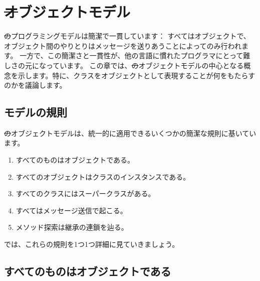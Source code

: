 \documentclass[a4paper,10pt,twoside]{book}
\begin{document}
	\renewcommand{\nnbb}[2]{} %
	\sloppy
\fi
\chapter{\st オブジェクトモデル}

\st のプログラミングモデルは簡潔で一貫しています： すべてはオブジェクトで、オブジェクト間のやりとりはメッセージを送りあうことによってのみ行われます。
一方で、この簡潔さと一貫性が、他の言語に慣れたプログラマにとって難しさの元になっています。
この章では、\st のオブジェクトモデルの中心となる概念を示します。特に、クラスをオブジェクトとして表現することが何をもたらすのかを議論します。

\section{モデルの規則}

\st のオブジェクトモデルは、統一的に適用できるいくつかの簡潔な規則に基いています。

\begin{enumerate}[label={\textbf{Rule \arabic{*}}.}, ref={Rule \arabic{*}}, leftmargin=*]
\item{} 
	すべてのものはオブジェクトである。

\item{} 
	すべてのオブジェクトはクラスのインスタンスである。

\item{}  
	すべてのクラスにはスーパークラスがある。

\item{}  
	すべてはメッセージ送信で起こる。

\item{}  
	メソッド探索は継承の連鎖を辿る。

\end{enumerate}

\noindent
では、これらの規則を1つ1つ詳細に見ていきましょう。


\section{すべてのものはオブジェクトである}
\end{document}
